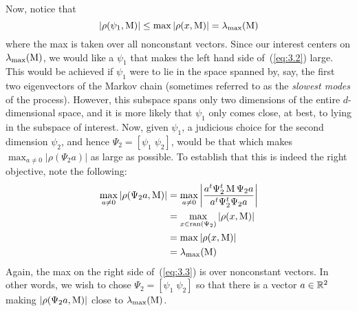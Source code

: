 Now, notice that
\begin{equation}
  \label{eq:3.2}
|\rho(\psi_1,\operatorname{M})| \leq \max |\rho(x,\operatorname{M})| = \lambda_{\max}(\operatorname{M})
\end{equation}
where the max is taken over all nonconstant vectors. Since our interest 
centers on 
$\lambda_{\max}(\operatorname{M})$, 
we would like a $\psi_1$ that makes the left hand side of~(\ref{eq:3.2}) large. 
This would be achieved if $\psi_1$ were to lie in the space spanned by, say, the
first two eigenvectors of the Markov chain (sometimes referred 
to as the \emph{slowest modes} of the process). However, this subspace spans
only two dimensions of the entire $d$-dimensional space, and it is more likely
that $\psi_1$ only comes close, at best, to lying in the subspace of
interest. Now, given $\psi_1$, a judicious choice for the second dimension $\psi_2$, and
hence $\Psi_2 = [\psi_1\; \psi_2]$, would be that which makes 
$\max_{a\neq 0} |\rho(\Psi_2 a)|$ as large as possible. To establish that 
this is indeed the right objective, note the following:
\begin{align}
\label{eq:3.3}
\max_{a\neq 0}|\rho(\Psi_2a,\operatorname{M})| &= \max_{a\neq 0} \left|\frac{a^t \Psi^t_2 \operatorname{M} \Psi_2 a}{a^t \Psi^t_2 \Psi_2 a}\right|\nonumber\\
&= \max_{x\in \operatorname{ran}(\Psi_2)}|\rho(x,\operatorname{M})|\nonumber\\
&= \max|\rho(x,\operatorname{M})|\\
&= \lambda_{\max}(\operatorname{M})\nonumber
\end{align}
Again, the max on the right side of~(\ref{eq:3.3}) is over nonconstant vectors. 
In other words, we wish to chose
$\Psi_2 = [\psi_1\; \psi_2]$ so that there is a vector $a \in \mathbb{R}^2$ making 
$|\rho(\Psi_2 a,\operatorname{M})|$ close to $\lambda_{\max}(\operatorname{M})$.

